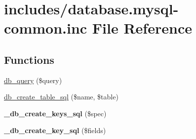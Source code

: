 \hypertarget{database_8mysql-common_8inc}{
\section{includes/database.mysql-common.inc File Reference}
\label{database_8mysql-common_8inc}
}
\subsection*{Functions}
\begin{CompactItemize}
\item 
\hyperlink{database_8mysql-common_8inc_9e096321b86945d128746ac7bedce8f3}{db\_\-query} (\$query)
\end{CompactItemize}
\begin{Indent}{\bf }\par
\begin{CompactItemize}
\item 
\hyperlink{group__schemaapi_gd567c41b41c4d48ed50af9b878c8ecaf}{db\_\-create\_\-table\_\-sql} (\$name, \$table)
\item 
\hypertarget{group__schemaapi_ga4be538758cb8279d3aeed18e1b25c2d}{
\textbf{\_\-db\_\-create\_\-keys\_\-sql} (\$spec)}
\label{group__schemaapi_ga4be538758cb8279d3aeed18e1b25c2d}

\item 
\hypertarget{group__schemaapi_gaaad5b3ac359e52b5c8e1058a3748615}{
\textbf{\_\-db\_\-create\_\-key\_\-sql} (\$fields)}
\label{group__schemaapi_gaaad5b3ac359e52b5c8e1058a3748615}


\end{CompactItemize}
\end{Indent}
